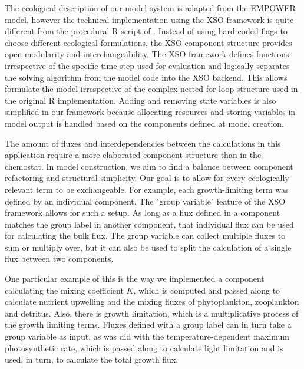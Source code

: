 \documentclass[journal abbreviation, manuscript]{copernicus}
\begin{document}
The ecological description of our model system is adapted from the EMPOWER model, however the technical implementation using the XSO framework is quite different from the procedural R script of \citet{Anderson2015c}. Instead of using hard-coded flags to choose different ecological formulations, the XSO component structure provides open modularity and interchangeability. The XSO framework defines functions irrespective of the specific time-step used for evaluation and logically separates the solving algorithm from the model code into the XSO backend. This allows formulate the model irrespective of the complex nested for-loop structure used in the original R implementation. Adding and removing state variables is also simplified in our framework because allocating resources and storing variables in model output is handled based on the components defined at model creation.

The amount of fluxes and interdependencies between the calculations in this application require a more elaborated component structure than in the chemostat. In model construction, we aim to find a balance between component refactoring and structural simplicity. Our goal is to allow for every ecologically relevant term to be exchangeable. For example, each growth-limiting term was defined by an individual component. The "group variable" feature of the XSO framework allows for such a setup. As long as a flux defined in a component matches the group label in another component, that individual flux can be used for calculating the bulk flux. The group variable can collect multiple fluxes to sum or multiply over, but it can also be used to split the calculation of a single flux between two components.

One particular example of this is the way we implemented a component calculating the mixing coefficient $K$, which is computed and passed along to calculate nutrient upwelling and the mixing fluxes of phytoplankton, zooplankton and detritus. Also, there is growth limitation, which is a multiplicative process of the growth limiting terms. Fluxes defined with a group label can in turn take a group variable as input, as was did with the temperature-dependent maximum photosynthetic rate, which is passed along to calculate light limitation and is used, in turn, to calculate the total growth flux. 
\end{document}
